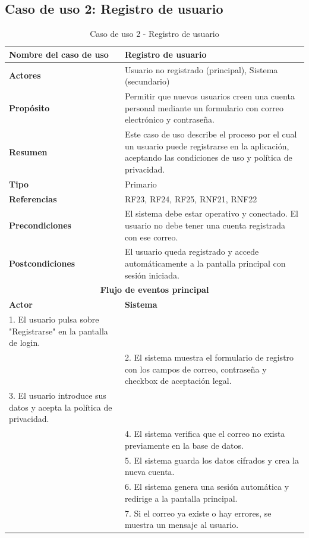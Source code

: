 \subsection{Caso de uso 2: Registro de usuario}

\begin{table}[H]
\centering
\caption{Caso de uso 2 - Registro de usuario}
\begin{tabular}{|p{4.5cm}|p{10.5cm}|}
\hline
\textbf{Nombre del caso de uso} & Registro de usuario \\
\hline
\textbf{Actores} & Usuario no registrado (principal), Sistema (secundario) \\
\hline
\textbf{Propósito} & Permitir que nuevos usuarios creen una cuenta personal mediante un formulario con correo electrónico y contraseña. \\
\hline
\textbf{Resumen} & Este caso de uso describe el proceso por el cual un usuario puede registrarse en la aplicación, aceptando las condiciones de uso y política de privacidad. \\
\hline
\textbf{Tipo} & Primario \\
\hline
\textbf{Referencias} & RF23, RF24, RF25, RNF21, RNF22 \\
\hline
\textbf{Precondiciones} & El sistema debe estar operativo y conectado. El usuario no debe tener una cuenta registrada con ese correo. \\
\hline
\textbf{Postcondiciones} & El usuario queda registrado y accede automáticamente a la pantalla principal con sesión iniciada. \\
\hline
\multicolumn{2}{|c|}{\textbf{Flujo de eventos principal}} \\
\hline
\textbf{Actor} & \textbf{Sistema} \\
\hline
1. El usuario pulsa sobre "Registrarse" en la pantalla de login. & \\
\hline
& 2. El sistema muestra el formulario de registro con los campos de correo, contraseña y checkbox de aceptación legal. \\
\hline
3. El usuario introduce sus datos y acepta la política de privacidad. & \\
\hline
& 4. El sistema verifica que el correo no exista previamente en la base de datos. \\
\hline
& 5. El sistema guarda los datos cifrados y crea la nueva cuenta. \\
\hline
& 6. El sistema genera una sesión automática y redirige a la pantalla principal. \\
\hline
& 7. Si el correo ya existe o hay errores, se muestra un mensaje al usuario. \\
\hline
\end{tabular}
\end{table}
